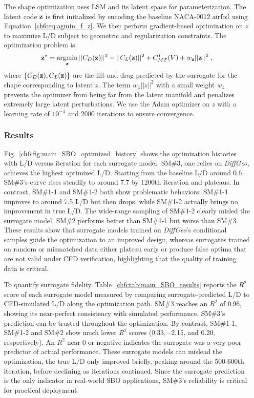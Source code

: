 The shape optimization uses LSM and its latent space for parameterization. The latent code $\mathbf{z}$ is first initialized by encoding the baseline NACA-0012 airfoil using Equation~\ref{ch6:eq:agmin_f_z}. We then perform gradient-based optimization on $z$ to maximize L/D subject to geometric and regularization constraints. The optimization problem is:
\begin{equation}
    \bz^* = \argmin_\bz ||C_D(\bz)||^2 - ||C_L(\bz)||^2 + C^I_{MT}(V) + w_\bz||\bz||^2\;,
\end{equation}
where $\{C_D(\mathbf{z}), C_L(\mathbf{z})\}$ are the lift and drag predicted by the surrogate for the shape corresponding to latent $z$. The term $w_z||z||^2$ with a small weight $w_z$ prevents the optimizer from being far from the latent manifold and penalizes extremely large latent perturbations. We use the Adam optimizer on $z$ with a learning rate of $10^{-4}$ and $2000$ iterations to ensure convergence.



\subsubsection{Results}
Fig.~\ref{ch6:fig:main_SBO_optimized_history} shows the optimization histories with L/D versus iteration for each surrogate model. SM\#3, one relies on \textit{DiffGeo}, achieves the highest optimized L/D. Starting from the baseline L/D around 0.6, SM\#3's curve rises steadily to around 7.7 by 1200th iteration and plateaus. In contrast, SM\#1-1 and SM\#1-2 both show problematic behaviors: SM\#1-1 improves to around 7.5 L/D but then drops, while SM\#1-2 actually brings no improvement in true L/D. The wide-range sampling of SM\#1-2 clearly misled the surrogate model. SM\#2 performs better than SM\#1-1 but worse than SM\#3. These results show that surrogate models trained on \textit{DiffGeo}’s conditional samples guide the optimization to an improved design, whereas surrogates trained on random or mismatched data either plateau early or produce false optima that are not valid under CFD verification, highlighting that the quality of training data is critical.


To quantify surrogate fidelity, Table~\ref{ch6:tab:main_SBO_results} reports the $R^2$ score of each surrogate model measured by comparing surrogate-predicted L/D to CFD-simulated L/D along the optimization path. SM\#3 reaches an $R^2$ of $0.96$, showing its near-perfect consistency with simulated performance. SM\#3's prediction can be trusted throughout the optimization. By contrast, SM\#1-1, SM\#1-2 and SM\#2 show much lower $R^2$ scores (0.33, –2.15, and 0.20, respectively). An $R^2$ near 0 or negative indicates the surrogate was a very poor predictor of actual performance. These surrogate models can mislead the optimization, the true L/D only improved briefly, peaking around the 500-600th iteration, before declining as iterations continued. Since the surrogate prediction is the only indicator in real-world SBO applications, SM\#3's reliability is critical for practical deployment.

